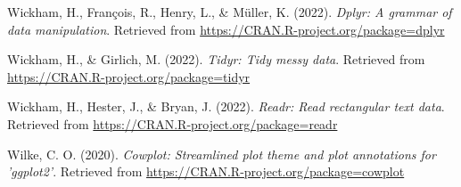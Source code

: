 \documentclass[
  man]{apa6}
\newlength{\cslhangindent}
\newlength{\cslentryspacingunit} %
\newenvironment{CSLReferences}[2] %
 {%
  \setlength{\parindent}{0pt}
  \ifodd #1
  \let\oldpar\par
  \def\par{\hangindent=\cslhangindent\oldpar}
  \fi
  \setlength{\parskip}{#2\cslentryspacingunit}
 }%
 {}
\begin{document}
\begin{CSLReferences}{1}{0}
\leavevmode{}%
Wickham, H., François, R., Henry, L., \& Müller, K. (2022). \emph{Dplyr: A grammar of data manipulation}. Retrieved from \url{https://CRAN.R-project.org/package=dplyr}

\leavevmode{}%
Wickham, H., \& Girlich, M. (2022). \emph{Tidyr: Tidy messy data}. Retrieved from \url{https://CRAN.R-project.org/package=tidyr}

\leavevmode{}%
Wickham, H., Hester, J., \& Bryan, J. (2022). \emph{Readr: Read rectangular text data}. Retrieved from \url{https://CRAN.R-project.org/package=readr}

\leavevmode{}%
Wilke, C. O. (2020). \emph{Cowplot: Streamlined plot theme and plot annotations for 'ggplot2'}. Retrieved from \url{https://CRAN.R-project.org/package=cowplot}

\end{CSLReferences}
\end{document}
